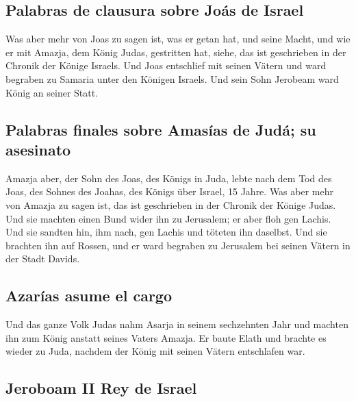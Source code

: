 \hypertarget{palabras-de-clausura-sobre-jouxe1s-de-israel}{%
\subsection{Palabras de clausura sobre Joás de
Israel}\label{palabras-de-clausura-sobre-jouxe1s-de-israel}}

 Was aber mehr von Joas zu sagen ist, was er getan hat,
und seine Macht, und wie er mit Amazja, dem König Judas, gestritten hat,
siehe, das ist geschrieben in der Chronik der Könige Israels.
 Und Joas entschlief mit seinen Vätern und ward begraben
zu Samaria unter den Königen Israels. Und sein Sohn Jerobeam ward König
an seiner Statt.

\hypertarget{palabras-finales-sobre-amasuxedas-de-juduxe1-su-asesinato}{%
\subsection{Palabras finales sobre Amasías de Judá; su
asesinato}\label{palabras-finales-sobre-amasuxedas-de-juduxe1-su-asesinato}}

 Amazja aber, der Sohn des Joas, des Königs in Juda,
lebte nach dem Tod des Joas, des Sohnes des Joahas, des Königs über
Israel, 15 Jahre.  Was aber mehr von Amazja zu sagen ist,
das ist geschrieben in der Chronik der Könige Judas.  Und
sie machten einen Bund wider ihn zu Jerusalem; er aber floh gen Lachis.
Und sie sandten hin, ihm nach, gen Lachis und töteten ihn daselbst.
 Und sie brachten ihn auf Rossen, und er ward begraben zu
Jerusalem bei seinen Vätern in der Stadt Davids.

\hypertarget{azaruxedas-asume-el-cargo}{%
\subsection{Azarías asume el cargo}\label{azaruxedas-asume-el-cargo}}

 Und das ganze Volk Judas nahm Asarja in seinem
sechzehnten Jahr und machten ihn zum König anstatt seines Vaters Amazja.
 Er baute Elath und brachte es wieder zu Juda, nachdem
der König mit seinen Vätern entschlafen war.

\hypertarget{jeroboam-ii-rey-de-israel}{%
\subsection{Jeroboam II Rey de Israel}\label{jeroboam-ii-rey-de-israel}}

